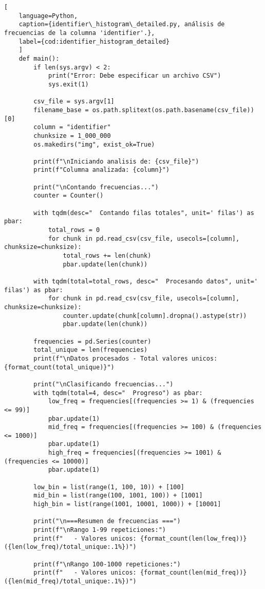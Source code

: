 \begin{lstlisting}[
    language=Python,
    caption={identifier\_histogram\_detailed.py, análisis de frecuencias de la columna 'identifier'.},
    label={cod:identifier_histogram_detailed}
    ]
    def main():
        if len(sys.argv) < 2:
            print("Error: Debe especificar un archivo CSV")
            sys.exit(1)

        csv_file = sys.argv[1]
        filename_base = os.path.splitext(os.path.basename(csv_file))[0]
        column = "identifier"  
        chunksize = 1_000_000  
        os.makedirs("img", exist_ok=True)

        print(f"\nIniciando analisis de: {csv_file}")
        print(f"Columna analizada: {column}")
        
        print("\nContando frecuencias...")
        counter = Counter()
        
        with tqdm(desc="  Contando filas totales", unit=' filas') as pbar:
            total_rows = 0
            for chunk in pd.read_csv(csv_file, usecols=[column], chunksize=chunksize):
                total_rows += len(chunk)
                pbar.update(len(chunk))
        
        with tqdm(total=total_rows, desc="  Procesando datos", unit=' filas') as pbar:
            for chunk in pd.read_csv(csv_file, usecols=[column], chunksize=chunksize):
                counter.update(chunk[column].dropna().astype(str))
                pbar.update(len(chunk))

        frequencies = pd.Series(counter)
        total_unique = len(frequencies)
        print(f"\nDatos procesados - Total valores unicos: {format_count(total_unique)}")

        print("\nClasificando frecuencias...")
        with tqdm(total=4, desc="  Progreso") as pbar:
            low_freq = frequencies[(frequencies >= 1) & (frequencies <= 99)]
            pbar.update(1)
            mid_freq = frequencies[(frequencies >= 100) & (frequencies <= 1000)]
            pbar.update(1)
            high_freq = frequencies[(frequencies >= 1001) & (frequencies <= 10000)]
            pbar.update(1)

        low_bin = list(range(1, 100, 10)) + [100]
        mid_bin = list(range(100, 1001, 100)) + [1001]
        high_bin = list(range(1001, 10001, 1000)) + [10001]

        print("\n===Resumen de frecuencias ===")
        print(f"\nRango 1-99 repeticiones:")
        print(f"   - Valores unicos: {format_count(len(low_freq))} ({len(low_freq)/total_unique:.1%})")
        
        print(f"\nRango 100-1000 repeticiones:")
        print(f"   - Valores unicos: {format_count(len(mid_freq))} ({len(mid_freq)/total_unique:.1%})")
        

\end{lstlisting}
